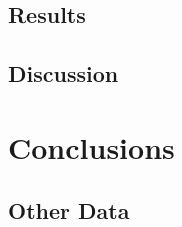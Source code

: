 \documentclass{apa6}
\begin{document}
\section{Results}
	
\section{Discussion}


\chapter{Conclusions}




\begin{appendices}
\section{Other Data}
	
\end{appendices}
\end{document}
